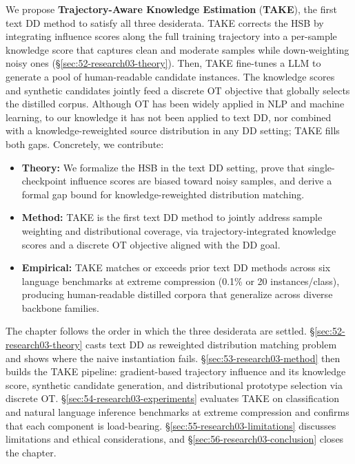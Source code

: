 \documentclass[12pt, a4paper, twoside]{book}
\numberwithin{equation}{chapter}
\theoremstyle{plain}
\theoremstyle{definition}
\theoremstyle{remark}
\newenvironment{foldable}{}{}
\begin{document}
\begin{foldable} We propose \textbf{Trajectory-Aware Knowledge Estimation} (\textbf{TAKE}), the first text \ac{DD} method to satisfy all three desiderata.
  TAKE corrects the \ac{HSB} by integrating influence scores along the full training trajectory into a per-sample knowledge score that captures clean and moderate samples while down-weighting noisy ones (\S\ref{sec:52-research03-theory}).
  Then, TAKE fine-tunes a \ac{LLM} to generate a pool of human-readable candidate instances.
  The knowledge scores and synthetic candidates jointly feed a discrete \ac{OT} objective that globally selects the distilled corpus.
  Although \ac{OT} has been widely applied in \ac{NLP} and machine learning, to our knowledge it has not been applied to text \ac{DD}, nor combined with a knowledge-reweighted source distribution in any \ac{DD} setting; TAKE fills both gaps.
  Concretely, we contribute:
  \begin{itemize}
    \item {
        \textbf{Theory:} We formalize the \ac{HSB} in the text \ac{DD} setting, prove that single-checkpoint influence scores are biased toward noisy samples, and derive a formal gap bound for knowledge-reweighted distribution matching.
      }
    \item {
        \textbf{Method:} TAKE is the first text \ac{DD} method to jointly address sample weighting and distributional coverage, via trajectory-integrated knowledge scores and a discrete \ac{OT} objective aligned with the \ac{DD} goal.
      }
    \item {
        \textbf{Empirical:} TAKE matches or exceeds prior text \ac{DD} methods across six language benchmarks at extreme compression (0.1\% or 20 instances/class), producing human-readable distilled corpora that generalize across diverse backbone families.
      }
  \end{itemize}
\end{foldable}

\begin{foldable} The chapter follows the order in which the three desiderata are settled.
  \S\ref{sec:52-research03-theory} casts text \ac{DD} as reweighted distribution matching problem and shows where the naive instantiation fails.
  \S\ref{sec:53-research03-method} then builds the TAKE pipeline: gradient-based trajectory influence and its knowledge score, synthetic candidate generation, and distributional prototype selection via discrete \ac{OT}.
  \S\ref{sec:54-research03-experiments} evaluates TAKE on classification and natural language inference benchmarks at extreme compression and confirms that each component is load-bearing.
  \S\ref{sec:55-research03-limitations} discusses limitations and ethical considerations, and \S\ref{sec:56-research03-conclusion} closes the chapter.
\end{foldable}
\end{document}
